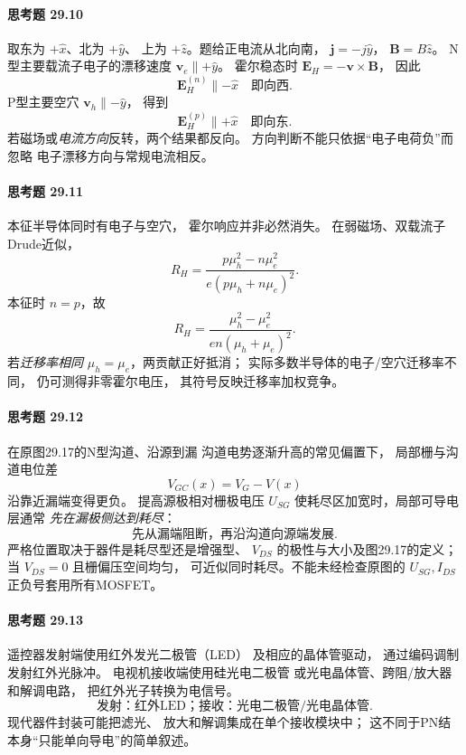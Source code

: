 \paragraph{思考题 29.10}
取东为 \(+\hat x\)、北为 \(+\hat y\)、
上为 \(+\hat z\)。题给正电流从北向南，
\(\boldsymbol j=-j\hat y\)，
\(\boldsymbol B=B\hat z\)。
N型主要载流子电子的漂移速度
\(\boldsymbol v_e\parallel+\hat y\)。
霍尔稳态时
\(\boldsymbol E_H=-\boldsymbol v\times\boldsymbol B\)，
因此
\[
\boxed{\boldsymbol E_H^{(n)}\parallel-\hat x
\quad\text{即向西}}.
\]
P型主要空穴
\(\boldsymbol v_h\parallel-\hat y\)，
得到
\[
\boxed{\boldsymbol E_H^{(p)}\parallel+\hat x
\quad\text{即向东}}.
\]
若磁场或\emph{电流方向}反转，两个结果都反向。
方向判断不能只依据“电子电荷负”而忽略
电子漂移方向与常规电流相反。

\paragraph{思考题 29.11}
本征半导体同时有电子与空穴，
霍尔响应并非必然消失。
在弱磁场、双载流子Drude近似，
\[
\boxed{
R_H=\frac{p\mu_h^2-n\mu_e^2}
{e(p\mu_h+n\mu_e)^2}}.
\]
本征时 \(n=p\)，故
\[
R_H=\frac{\mu_h^2-\mu_e^2}
{en(\mu_h+\mu_e)^2}.
\]
若\emph{迁移率相同}
\(\mu_h=\mu_e\)，两贡献正好抵消；
实际多数半导体的电子/空穴迁移率不同，
仍可测得非零霍尔电压，
其符号反映迁移率加权竞争。

\paragraph{思考题 29.12}
在原图29.17的N型沟道、沿源到漏
沟道电势逐渐升高的常见偏置下，
局部栅与沟道电位差
\[
V_{GC}(x)=V_G-V(x)
\]
沿靠近漏端变得更负。
提高源极相对栅极电压 \(U_{SG}\)
使耗尽区加宽时，局部可导电层通常
\emph{先在漏极侧达到耗尽}：
\[
\boxed{\text{先从漏端阻断，再沿沟道向源端发展}}.
\]
严格位置取决于器件是耗尽型还是增强型、
\(V_{DS}\) 的极性与大小及图29.17的定义；
当 \(V_{DS}=0\) 且栅偏压空间均匀，
可近似同时耗尽。不能未经检查原图的
\(U_{SG},I_{DS}\) 正负号套用所有MOSFET。

\paragraph{思考题 29.13}
遥控器发射端使用红外发光二极管（LED）
及相应的晶体管驱动，
通过编码调制发射红外光脉冲。
电视机接收端使用硅光电二极管
或光电晶体管、跨阻/放大器和解调电路，
把红外光子转换为电信号。
\[
\boxed{\text{发射：红外LED；接收：光电二极管/光电晶体管}}.
\]
现代器件封装可能把滤光、
放大和解调集成在单个接收模块中；
这不同于PN结本身“只能单向导电”的简单叙述。
